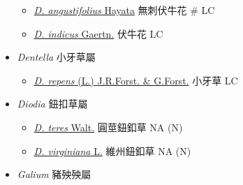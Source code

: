 \begin{itemize}
  \begin{itemize}
        \item[] \href{http://www.theplantlist.org/tpl1.1/search?q=Damnacanthus+angustifolius}{\textit{D. angustifolius} Hayata}   無刺伏牛花  \# LC
        \item[] \href{http://www.theplantlist.org/tpl1.1/search?q=Damnacanthus+indicus}{\textit{D. indicus} Gaertn.}   伏牛花   LC
  \end{itemize}
 \item[] \textit{Dentella} 小牙草屬
                                
  \begin{itemize}
        \item[] \href{http://www.theplantlist.org/tpl1.1/search?q=Dentella+repens}{\textit{D. repens} (L.) J.R.Forst. \& G.Forst.}   小牙草   LC
  \end{itemize}
 \item[] \textit{Diodia} 鈕扣草屬
                                
  \begin{itemize}
        \item[] \href{http://www.theplantlist.org/tpl1.1/search?q=Diodia+teres}{\textit{D. teres} Walt.}   圓莖鈕釦草   NA (N)
        \item[] \href{http://www.theplantlist.org/tpl1.1/search?q=Diodia+virginiana}{\textit{D. virginiana} L.}   維州鈕釦草   NA (N)
  \end{itemize}
 \item[] \textit{Galium} 豬殃殃屬
                                

\end{itemize}
